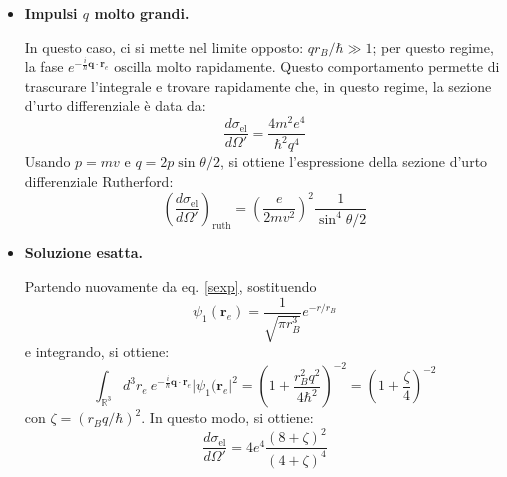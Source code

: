 \documentclass[11pt, a4paper]{scrartcl} %
\numberwithin{equation}{subsection}
\theoremstyle{style2}
\theoremstyle{style1}
\begin{document}
\begin{itemize}
\[\] 
Questo integrale si pu\`o ridurre alla forma
\[
\frac{d \sigma _\text{el}}{d \Omega '} \simeq \frac{m^2 e^4}{9 \hbar ^4}\left\lvert \int d^3r_e \ r_e^2 \lvert \psi _1(\mathbf{r} _e )\rvert ^2 \right\rvert ^2 = \frac{1}{9r_B^2}\left\lvert \int r_e^2 \lvert \psi _1(\mathbf{r} _e) \rvert ^2 \ d^3 r_e \right\rvert ^2
\] 
dove si \`e usato che, in CGS, $r_B = \hbar ^2 / me^2$.
L'integrale con cui si rimane \`e quello del raggio quadratico medio $\langle r_e^2 \rangle= 3 r_B^2$; allora il valore della sezione d'urto differenziale nel caso di piccoli impulsi \`e
\begin{equation}
	\frac{d \sigma_\text{el} }{d \Omega '} \simeq \frac{r_B^2}{3}
\end{equation}
\item \textbf{Impulsi $q$ molto grandi.} 

	In questo caso, ci si mette nel limite opposto: $qr_B / \hbar \gg 1$; per questo regime, la fase $e^{-\frac{i}{\hbar }\mathbf{q} \cdot \mathbf{r} _e} $ oscilla molto rapidamente.
	Questo comportamento permette di trascurare l'integrale e trovare rapidamente che, in questo regime, la sezione d'urto differenziale \`e data da:
	\begin{equation}
		\frac{d \sigma _\text{el}}{d \Omega '} = \frac{4m^2 e^4}{\hbar ^2 q^4}
	\end{equation}
	Usando $p=mv$ e $q=2p \sin \theta  / 2$, si ottiene l'espressione della sezione d'urto differenziale Rutherford:
	\begin{equation}
		\left(\frac{d \sigma _\text{el}}{d \Omega '} \right) _\text{ruth}= \left(\frac{e}{2mv^2}\right) ^2 \frac{1}{\sin^4 \theta /2}
	\end{equation}
\item \textbf{Soluzione esatta.} 

	Partendo nuovamente da eq. \ref{sexp}, sostituendo 
	\[
	\psi _1 (\mathbf{r} _e) = \frac{1}{\sqrt{\pi r^3_B} } e^{-r / r_B} 
	\] 
	e integrando, si ottiene:
	\[
	\int_{\mathbb{R}^3} d^3 r_e \ e^{-\frac{i}{\hbar } \mathbf{q} \cdot \mathbf{r} _e} \lvert \psi _1(\mathbf{r} _e \rvert ^2 = \left(1+\frac{r_B^2 q^2}{4\hbar ^2}\right) ^{-2} = \left(1+ \frac{\zeta}{4}\right) ^{-2} 
	\] 
	con $\zeta = (r_B q / \hbar )^2$. 
	In questo modo, si ottiene:
	\begin{equation}
		\frac{d \sigma _\text{el}}{d \Omega '} = 4e^4 \frac{(8 + \zeta)^2}{(4 + \zeta)^4}
	\end{equation}

\end{itemize}
\end{document}

